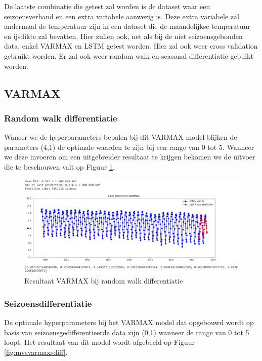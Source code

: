 De laatste combinatie die getest zal worden is de dataset waar een seizoensverband en een extra variabele aanwezig is. Deze extra variabele zal andermaal de temperatuur zijn in een dataset die de maandelijkse temperatuur en ijsdikte zal bevatten. Hier zullen ook, net als bij de niet seizoensgebonden data, enkel VARMAX en LSTM getest worden. Hier zal ook weer cross validation gebruikt worden. Er zal ook weer random walk en seasonal differentiatie gebuikt worden.

\subsection{VARMAX}
\subsubsection{Random walk differentiatie}

Waneer we de hyperparameters bepalen bij dit VARMAX model blijken de parameters (4,1) de optimale waarden te zijn bij een range van 0 tot 5. Wanneer we deze invoeren om een uitgebreider resultaat te krijgen bekomen we de uitvoer die te beschouwen valt op Figuur \ref{fig:mvsvarmaxdiff}.

\begin{figure}
    \centering
    \caption{Resultaat VARMAX bij random walk differentiatie}
    \label{fig:mvsvarmaxdiff}
    \includegraphics[width=1\linewidth]{mv_s_varmax_diff}
\end{figure}


\subsubsection{Seizoensdifferentiatie}
De optimale hyperparameters bij het VARMAX model dat opgebouwd wordt op basis van seizoensgedifferentieerde data zijn (0,1) wanneer de range van 0 tot 5 loopt. Het resultaat van dit model wordt afgebeeld op Figuur \ref{fig:mvsvarmaxsdiff}.


